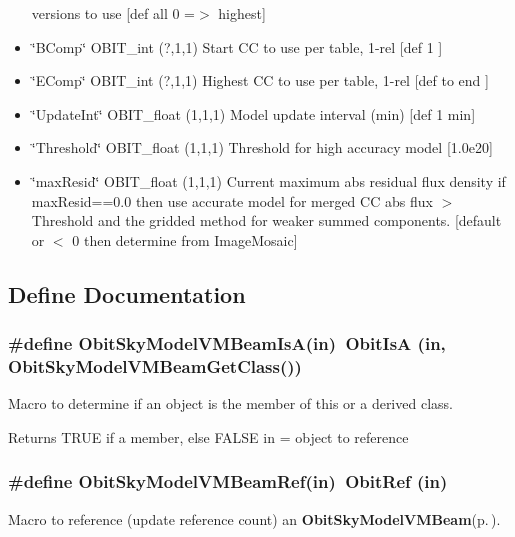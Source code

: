 \begin{itemize}
versions to use [def all 0 =$>$ highest] \item \char`\"{}BComp\char`\"{} OBIT\_\-int (?,1,1) Start CC to use per table, 1-rel [def 1 ] \item \char`\"{}EComp\char`\"{} OBIT\_\-int (?,1,1) Highest CC to use per table, 1-rel [def to end ] \item \char`\"{}Update\-Int\char`\"{} OBIT\_\-float (1,1,1) Model update interval (min) [def 1 min] \item \char`\"{}Threshold\char`\"{} OBIT\_\-float (1,1,1) Threshold for high accuracy model [1.0e20] \item \char`\"{}max\-Resid\char`\"{} OBIT\_\-float (1,1,1) Current maximum abs residual flux density if max\-Resid==0.0 then use accurate model for merged CC abs flux $>$ Threshold and the gridded method for weaker summed components. [default or $<$ 0 then determine from Image\-Mosaic]\end{itemize}


\subsection{Define Documentation}
\subsubsection{\setlength{\rightskip}{0pt plus 5cm}\#define Obit\-Sky\-Model\-VMBeam\-Is\-A(in)\ Obit\-Is\-A (in, Obit\-Sky\-Model\-VMBeam\-Get\-Class())}\label{ObitSkyModelVMBeam_8h_a2}


Macro to determine if an object is the member of this or a derived class. 

Returns TRUE if a member, else FALSE in = object to reference 
\subsubsection{\setlength{\rightskip}{0pt plus 5cm}\#define Obit\-Sky\-Model\-VMBeam\-Ref(in)\ Obit\-Ref (in)}\label{ObitSkyModelVMBeam_8h_a1}


Macro to reference (update reference count) an {\bf Obit\-Sky\-Model\-VMBeam}{\rm (p.\,\pageref{structObitSkyModelVMBeam})}. 

